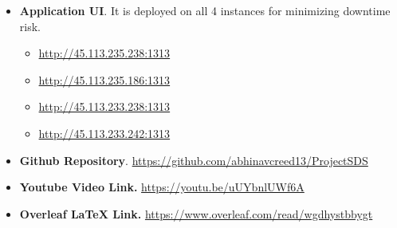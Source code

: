 \begin{itemize}
    \item \textbf{Application UI}. It is deployed on all 4 instances for minimizing downtime risk.
    \begin{itemize}
    \item \url{http://45.113.235.238:1313}
    \item \url{http://45.113.235.186:1313}
    \item \url{http://45.113.233.238:1313}
    \item \url{http://45.113.233.242:1313}
    \end{itemize}
    \item \textbf{Github Repository}. \url{https://github.com/abhinavcreed13/ProjectSDS}
    \item \textbf{Youtube Video Link.} \url{https://youtu.be/uUYbnlUWf6A}
    \item \textbf{Overleaf LaTeX Link.} \url{https://www.overleaf.com/read/wgdhystbbygt}
\end{itemize}
